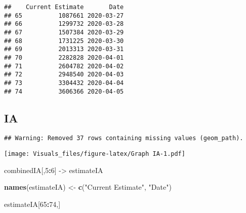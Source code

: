 \documentclass[]{article}
\newenvironment{Shaded}{\begin{snugshade}}{\end{snugshade}}
\newcommand{\DataTypeTok}[1]{\textcolor[rgb]{0.13,0.29,0.53}{#1}}
\newcommand{\DecValTok}[1]{\textcolor[rgb]{0.00,0.00,0.81}{#1}}
\newcommand{\FloatTok}[1]{\textcolor[rgb]{0.00,0.00,0.81}{#1}}
\newcommand{\KeywordTok}[1]{\textcolor[rgb]{0.13,0.29,0.53}{\textbf{#1}}}
\newcommand{\NormalTok}[1]{#1}
\newcommand{\OperatorTok}[1]{\textcolor[rgb]{0.81,0.36,0.00}{\textbf{#1}}}
\newcommand{\StringTok}[1]{\textcolor[rgb]{0.31,0.60,0.02}{#1}}
\begin{document}
\begin{verbatim}
##    Current Estimate       Date
## 65          1087661 2020-03-27
## 66          1299732 2020-03-28
## 67          1507384 2020-03-29
## 68          1731225 2020-03-30
## 69          2013313 2020-03-31
## 70          2282828 2020-04-01
## 71          2604782 2020-04-02
## 72          2948540 2020-04-03
## 73          3304432 2020-04-04
## 74          3606366 2020-04-05
\end{verbatim}

\hypertarget{ia}{%
\subsection{IA}\label{ia}}

\begin{Shaded}
\end{Shaded}

\begin{verbatim}
## Warning: Removed 37 rows containing missing values (geom_path).
\end{verbatim}

\texttt{[image: Visuals\_files/figure-latex/Graph IA-1.pdf]}

\begin{Shaded}
\begin{Highlighting}[]
\NormalTok{combinedIA[,}\DecValTok{5}\OperatorTok{:}\DecValTok{6}\NormalTok{] ->}\StringTok{ }\NormalTok{estimateIA}

\KeywordTok{names}\NormalTok{(estimateIA) <-}\StringTok{ }\KeywordTok{c}\NormalTok{(}\StringTok{"Current Estimate"}\NormalTok{, }\StringTok{"Date"}\NormalTok{)}

\NormalTok{estimateIA[}\DecValTok{65}\OperatorTok{:}\DecValTok{74}\NormalTok{,]}
\end{Highlighting}
\end{Shaded}
\end{document}
